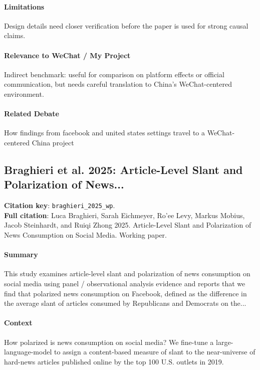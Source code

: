 \documentclass[12pt]{article}
\begin{document}
\paragraph{Limitations} Design details need closer verification before the paper is used for strong causal claims.

\paragraph{Relevance to WeChat / My Project} Indirect benchmark: useful for comparison on platform effects or official communication, but needs careful translation to China's WeChat-centered environment.

\paragraph{Related Debate} How findings from facebook and united states settings travel to a WeChat-centered China project


\subsection{Braghieri et al. 2025: Article-Level Slant and Polarization of News...}
\textbf{Citation key}: \texttt{braghieri\_2025\_wp}.\\
\textbf{Full citation}: Luca Braghieri, Sarah Eichmeyer, Ro'ee Levy, Markus Mobius, Jacob Steinhardt, and Ruiqi Zhong 2025. Article-Level Slant and Polarization of News Consumption on Social Media. Working paper.

\paragraph{Summary} This study examines article-level slant and polarization of news consumption on social media using panel / observational analysis evidence and reports that we find that polarized news consumption on Facebook, defined as the difference in the average slant of articles consumed by Republicans and Democrats on the...

\paragraph{Context} How polarized is news consumption on social media? We fine-tune a large-language-model to assign a content-based measure of slant to the near-universe of hard-news articles published online by the top 100 U.S. outlets in 2019.
\end{document}
